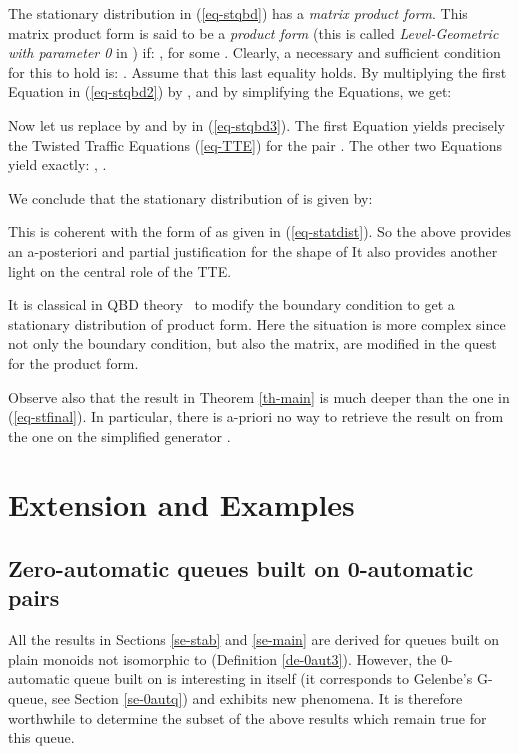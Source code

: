 \documentclass[11pt,a4paper]{article}
\theoremstyle{remark}
\def\eref#1{(\ref{#1})}
\begin{document}
\medskip

The stationary distribution  in \eref{eq-stqbd} has a
{\em matrix product form}. 
This matrix product form is said to be a {\em product form} (this
is called {\em Level-Geometric with parameter 0} in \cite{DaQu}) if:
, for some . Clearly, a necessary and sufficient condition for this to hold
is: .  Assume that this last equality holds.
By multiplying the first Equation in \eref{eq-stqbd2} by , and by
simplifying the Equations, we get:

Now let us replace  by  and  by  in
\eref{eq-stqbd3}. The first Equation yields precisely the Twisted
Traffic Equations \eref{eq-TTE} for the pair . The other two Equations
yield exactly: , .

We conclude that the stationary distribution of
 is given by:


This is coherent with the form of  as given in
\eref{eq-statdist}.
So the above provides an a-posteriori and partial justification for the shape of 
It also provides another light on the central role of the TTE.

It is classical in QBD theory~\cite{LaRa,DaQu} to modify the boundary condition to
get a stationary distribution of product form. Here the situation is
more complex since not only the
boundary condition, but also the  matrix, are modified in the
quest for the product form.

Observe also that the result in Theorem \ref{th-main} is
much deeper than the one in \eref{eq-stfinal}. In particular, there
is a-priori no way to retrieve the result on  from the one on the
simplified generator .




\section{Extension and Examples}\label{se-examples}

\subsection{Zero-automatic queues built on 0-automatic pairs}\label{sse-G}

All the results in Sections \ref{se-stab} and \ref{se-main} are
derived for queues built on plain monoids not isomorphic to  
(Definition \ref{de-0aut3}). 
However, the 0-automatic queue built on  is interesting in itself
(it corresponds to Gelenbe's G-queue, see Section \ref{se-0autq}) and
exhibits new phenomena. It is therefore worthwhile to determine the subset of the above
results which remain true for this queue. 
\end{document}
